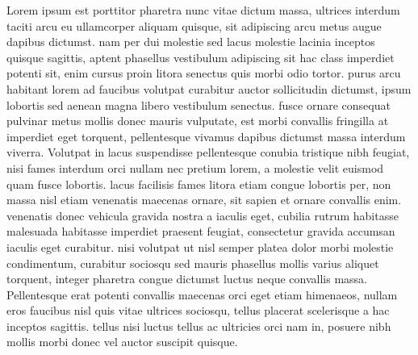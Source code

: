 \documentclass[12pt]{article}
\begin{document}
Lorem ipsum est porttitor pharetra nunc vitae dictum massa, ultrices interdum taciti arcu eu ullamcorper aliquam quisque, sit adipiscing arcu metus augue dapibus dictumst. nam per dui molestie sed lacus molestie lacinia inceptos quisque sagittis, aptent phasellus vestibulum adipiscing sit hac class imperdiet potenti sit, enim cursus proin litora senectus quis morbi odio tortor. purus arcu habitant lorem ad faucibus volutpat curabitur auctor sollicitudin dictumst, ipsum lobortis sed aenean magna libero vestibulum senectus. fusce ornare consequat pulvinar metus mollis donec mauris vulputate, est morbi convallis fringilla at imperdiet eget torquent, pellentesque vivamus dapibus dictumst massa interdum viverra. Volutpat in lacus suspendisse pellentesque conubia tristique nibh feugiat, nisi fames interdum orci nullam nec pretium lorem, a molestie velit euismod quam fusce lobortis. lacus facilisis fames litora etiam congue lobortis per, non massa nisl etiam venenatis maecenas ornare, sit sapien et ornare convallis enim. venenatis donec vehicula gravida nostra a iaculis eget, cubilia rutrum habitasse malesuada habitasse imperdiet praesent feugiat, consectetur gravida accumsan iaculis eget curabitur. nisi volutpat ut nisl semper platea dolor morbi molestie condimentum, curabitur sociosqu sed mauris phasellus mollis varius aliquet torquent, integer pharetra congue dictumst luctus neque convallis massa. Pellentesque erat potenti convallis maecenas orci eget etiam himenaeos, nullam eros faucibus nisl quis vitae ultrices sociosqu, tellus placerat scelerisque a hac inceptos sagittis. tellus nisi luctus tellus ac ultricies orci nam in, posuere nibh mollis morbi donec vel auctor suscipit quisque.
\pagebreak %
\end{document}
